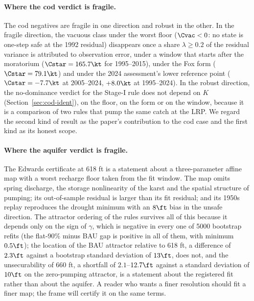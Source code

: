 \paragraph{Where the cod verdict is fragile.}
The cod negatives are fragile in one direction and robust in the other. In the fragile direction, the vacuous class under the worst floor ($\Cvac<0$: no state is one-step safe at the 1992 residual) disappears once a share $\lambda\ge0.2$ of the residual variance is attributed to observation error, under a window that starts after the moratorium ($\Cstar=165.7\kt$ for 1995--2015), under the Fox form ($\Cstar=79.1\kt$) and under the 2024 assessment's lower reference point ($\Cstar=-7.7\kt$ at 2005--2024, $+8.0\kt$ at 1995--2024). In the robust direction, the no-dominance verdict for the Stage-I rule does not depend on $K$ (Section~\ref{sec:cod-ident}), on the floor, on the form or on the window, because it is a comparison of two rules that pump the same catch at the LRP. We regard the second kind of result as the paper's contribution to the cod case and the first kind as its honest scope.

\paragraph{Where the aquifer verdict is fragile.}
The Edwards certificate at 618 ft is a statement about a three-parameter affine map with a worst recharge floor taken from the fit window. The map omits spring discharge, the storage nonlinearity of the karst and the spatial structure of pumping; its out-of-sample residual is larger than its fit residual; and its 1950s replay reproduces the drought minimum with an $8\ft$ bias in the unsafe direction. The attractor ordering of the rules survives all of this because it depends only on the sign of $\gamma$, which is negative in every one of 5000 bootstrap refits (the flat-90\% minus BAU gap is positive in all of them, with minimum $0.5\ft$); the location of the BAU attractor relative to 618 ft, a difference of $2.3\ft$ against a bootstrap standard deviation of $13\ft$, does not, and the unsecurability of 660 ft, a shortfall of $2.1$--$12.7\ft$ against a standard deviation of $10\ft$ on the zero-pumping attractor, is a statement about the registered fit rather than about the aquifer. A reader who wants a finer resolution should fit a finer map; the frame will certify it on the same terms.

